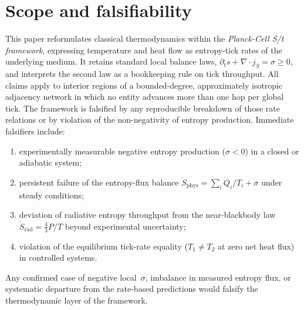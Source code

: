 \section*{Scope and falsifiability}
This paper reformulates classical thermodynamics within the
\emph{Planck-Cell S/t framework}, expressing temperature and heat flow as
entropy-tick rates of the underlying medium.  It retains standard local
balance laws,
\(\partial_t s + \nabla\!\cdot\! j_S = \sigma \ge 0\),
and interprets the second law as a bookkeeping rule on tick throughput.
All claims apply to interior regions of a bounded-degree, approximately
isotropic adjacency network in which no entity advances more than one hop
per global tick.
The framework is falsified by any reproducible breakdown of those rate
relations or by violation of the non-negativity of entropy production.
Immediate falsifiers include:
\begin{enumerate}[label=(\roman*)]
  \item experimentally measurable negative entropy production
        ($\sigma < 0$) in a closed or adiabatic system;
  \item persistent failure of the entropy-flux balance
        \(\dot{S}_{\mathrm{phys}} = \sum_i \dot{Q}_i/T_i + \sigma\)
        under steady conditions;
  \item deviation of radiative entropy throughput from the near-blackbody
        law \(\dot{S}_{\mathrm{rad}} = \tfrac{4}{3}P/T\) beyond experimental
        uncertainty;
  \item violation of the equilibrium tick-rate equality
        (\(T_1 \ne T_2\) at zero net heat flux) in controlled systems.
\end{enumerate}
Any confirmed case of negative local~$\sigma$, imbalance in measured
entropy flux, or systematic departure from the rate-based predictions
would falsify the thermodynamic layer of the framework.

